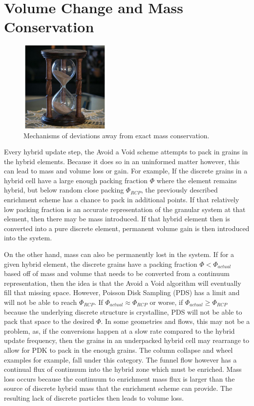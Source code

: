 \section{Volume Change and Mass Conservation}

\begin{figure}[htp] 
    \centering
    \includegraphics[width=0.4\textwidth]{figs/hourglass_whole.jpg}
    \caption{Mechanisms of deviations away from exact mass conservation.}
    \label{mass_change_mechanism}
\end{figure}

Every hybrid update step, the Avoid a Void scheme attempts to pack in grains in the hybrid elements. Because it does so in an uninformed matter however, this can lead to mass and volume loss or gain. For example, If the discrete grains in a hybrid cell have a large enough packing fraction $\Phi$ where the element remains hybrid, but below random close packing $\Phi_{RCP}$, the previously described enrichment scheme has a chance to pack in additional points. If that relatively low packing fraction is an accurate representation of the granular system at that element, then there may be mass introduced. If that hybrid element then is converted into a pure discrete element, permanent volume gain is then introduced into the system. 

On the other hand, mass can also be permanently lost in the system. If for a given hybrid element, the discrete grains have a packing fraction $\Phi < \Phi_{actual}$ based off of mass and volume that needs to be converted from a continuum representation, then the idea is that the Avoid a Void algorithm will eventually fill that missing space. However, Poisson Disk Sampling (PDS) has a limit and will not be able to reach $\Phi_{RCP}$. If $\Phi_{actual} \approx \Phi_{RCP}$ or worse, if $\Phi_{actual} \geq \Phi_{RCP}$ because the underlying discrete structure is crystalline, PDS will not be able to pack that space to the desired $\Phi$. In some geometries and flows, this may not be a problem, as, if the conversions happen at a slow rate compared to the hybrid update frequency, then the grains in an underpacked hybrid cell may rearrange to allow for PDK to pack in the enough grains. The column collapse and wheel examples for example, fall under this category. The funnel flow however has a continual flux of continuum into the hybrid zone which must be enriched. Mass loss occurs because the continuum to enrichment mass flux is larger than the source of discrete hybrid mass that the enrichment scheme can provide. The resulting lack of discrete particles then leads to volume loss.

